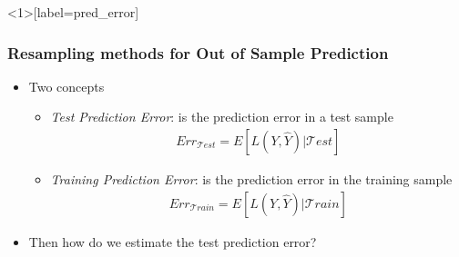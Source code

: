\documentclass[
  shownotes,
  xcolor={svgnames},
  hyperref={colorlinks,citecolor=DarkBlue,linkcolor=andesred,urlcolor=DarkBlue}
  , aspectratio=169]{beamer}
\begin{document}
\begin{frame}<1>[label=pred_error]
\frametitle{Resampling methods for Out of Sample Prediction}


\begin{itemize}
\item Two concepts
\medskip
\begin{itemize}
  \item {\it Test Prediction Error}: is the prediction error in a test sample
  \begin{align}
    Err_{\mathcal{T}est} =E[L(Y,\hat Y)|\mathcal{T}est]
  \end{align}
  \medskip
  \item {\it Training Prediction Error}: is the prediction error in the training sample
  \begin{align}
    Err_{\mathcal{T}rain} =E[L(Y,\hat Y)|\mathcal{T}rain]
  \end{align}
\end{itemize}
\medskip
\pause
  \item Then how do we estimate the test prediction error?
\end{itemize}

\end{frame}




\end{document}
